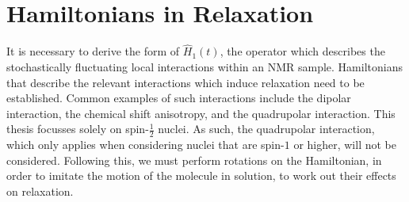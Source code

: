 \section{Hamiltonians in Relaxation}
It is necessary to derive the form of $\hat{H}_1(t)$, the operator which describes the stochastically fluctuating local interactions within an NMR sample. Hamiltonians that describe the relevant interactions which induce relaxation need to be established. Common examples of such interactions include the dipolar interaction, the chemical shift anisotropy, and the quadrupolar interaction. This thesis focusses solely on spin-$\frac{1}{2}$ nuclei. As such, the quadrupolar interaction, which only applies when considering nuclei that are spin-$1$ or higher, will not be considered. Following this, we must perform rotations on the Hamiltonian, in order to imitate the motion of the molecule in solution, to work out their effects on relaxation.
